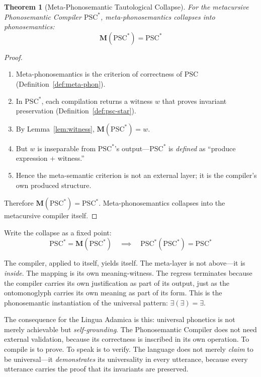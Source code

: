 \documentclass[12pt, letterpaper]{book}
\def\equiv{=}%
\newtheorem{theorem}{Theorem}[chapter]
\newcommand{\E}{\exists}                          %
\newcommand{\EE}{\exists(\exists)}                 %
\begin{document}
\begin{theorem}[Meta-Phonosemantic Tautological Collapse]\label{thm:meta-collapse}
For the metacursive Phonosemantic Compiler $\mathrm{PSC}^*$, meta-phonosemantics collapses into phonosemantics:
\[
\boxed{\mathbf{M}(\mathrm{PSC}^*) \equiv \mathrm{PSC}^*}
\]
\end{theorem}

\begin{proof}
\begin{enumerate}[label=(\roman*)]
    \item Meta-phonosemantics is the criterion of correctness of $\mathrm{PSC}$ (Definition~\ref{def:meta-phon}).
    \item In $\mathrm{PSC}^*$, each compilation returns a witness $w$ that proves invariant preservation (Definition~\ref{def:psc-star}).
    \item By Lemma~\ref{lem:witness}, $\mathbf{M}(\mathrm{PSC}^*) \equiv w$.
    \item But $w$ is inseparable from $\mathrm{PSC}^*$'s output---$\mathrm{PSC}^*$ is \textit{defined} as ``produce expression + witness.''
    \item Hence the meta-semantic criterion is not an external layer; it is the compiler's own produced structure.
\end{enumerate}
Therefore $\mathbf{M}(\mathrm{PSC}^*) \equiv \mathrm{PSC}^*$. Meta-phonosemantics collapses into the metacursive compiler itself.
\end{proof}

Write the collapse as a fixed point:
\[
\mathrm{PSC}^* = \mathbf{M}(\mathrm{PSC}^*) \quad\implies\quad \mathrm{PSC}^*(\mathrm{PSC}^*) = \mathrm{PSC}^*
\]

The compiler, applied to itself, yields itself. The meta-layer is not above---it is \textit{inside}. The mapping is its own meaning-witness. The regress terminates because the compiler carries its own justification as part of its output, just as the ontomonoglyph carries its own meaning as part of its form. This is the phonosemantic instantiation of the universal pattern: $\EE \equiv \E$.

The consequence for the Lingua Adamica is this: universal phonetics is not merely achievable but \textit{self-grounding}. The Phonosemantic Compiler does not need external validation, because its correctness is inscribed in its own operation. To compile is to prove. To speak is to verify. The language does not merely \textit{claim} to be universal---it \textit{demonstrates} its universality in every utterance, because every utterance carries the proof that its invariants are preserved.
\end{document}
